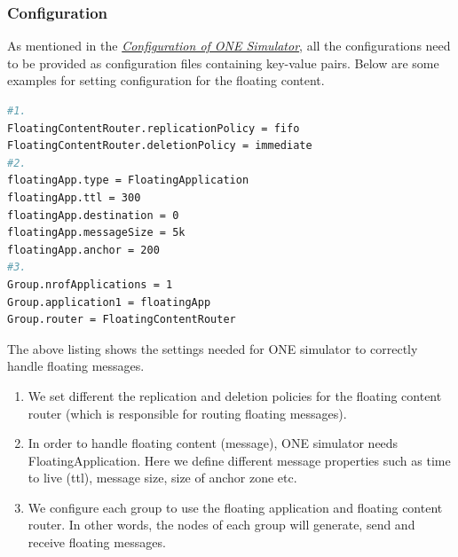 \subsubsection{Configuration}
As mentioned in the \hyperref[one:configuration]{\emph{Configuration of ONE Simulator}}, all the configurations need to be provided as configuration files containing key-value pairs. Below are some examples for setting configuration for the floating content.

\begin{lstlisting}[language=bash]
#1.
FloatingContentRouter.replicationPolicy = fifo
FloatingContentRouter.deletionPolicy = immediate
#2.
floatingApp.type = FloatingApplication
floatingApp.ttl = 300
floatingApp.destination = 0
floatingApp.messageSize = 5k
floatingApp.anchor = 200
#3.
Group.nrofApplications = 1
Group.application1 = floatingApp
Group.router = FloatingContentRouter

\end{lstlisting}
\vspace{3mm}
The above listing shows the settings needed for ONE simulator to correctly handle floating messages.
\begin{enumerate}
  \item We set different the replication and deletion policies for the floating content router (which is responsible for routing floating messages).
  \item In order to handle floating content (message), ONE simulator needs FloatingApplication.  Here we define different message properties such as time to live (ttl), message size, size of anchor zone etc.
  \item We configure each group to use the floating application and floating content router. In other words, the nodes of each group will generate, send and receive floating messages.
\end{enumerate}
